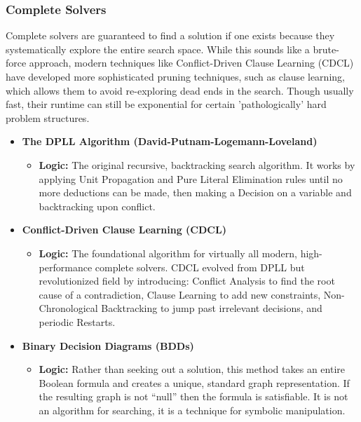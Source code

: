 \documentclass[12pt, a4paper, oneside]{report} %
\begin{document}
\subsubsection{Complete Solvers}
Complete solvers are guaranteed to find a solution if one exists because they systematically explore the entire search space. While this sounds like a brute-force approach, modern techniques like Conflict-Driven Clause Learning (CDCL) have developed more sophisticated pruning techniques, such as clause learning, which allows them to avoid re-exploring dead ends in the search. Though usually fast, their runtime can still be exponential for certain 'pathologically' hard problem structures.
\begin{itemize}
    \item \textbf{The DPLL Algorithm (David-Putnam-Logemann-Loveland)} \cite{Davis1962}
    \begin{itemize}
        \item \textbf{Logic:} The original recursive, backtracking search algorithm. It works by applying Unit Propagation and Pure Literal Elimination rules until no more deductions can be made, then making a Decision on a variable and backtracking upon conflict.
    \end{itemize}
    \item \textbf{Conflict-Driven Clause Learning (CDCL)} \cite{HandbookSAT2009}
    \begin{itemize}
        \item \textbf{Logic:} The foundational algorithm for virtually all modern, high-performance complete solvers. CDCL evolved from DPLL but revolutionized field by introducing: Conflict Analysis to find the root cause of a contradiction, Clause Learning to add new constraints, Non-Chronological Backtracking to jump past irrelevant decisions, and periodic Restarts.
    \end{itemize}
    \item \textbf{Binary Decision Diagrams (BDDs)} \cite{DrechslerSieling2001}
    \begin{itemize}
        \item \textbf{Logic:} Rather than seeking out a solution, this method takes an entire Boolean formula and creates a unique, standard graph representation. If the resulting graph is not “null” then the formula is satisfiable. It is not an algorithm for searching, it is a technique for symbolic manipulation.
    \end{itemize}
\end{itemize}
\end{document}
